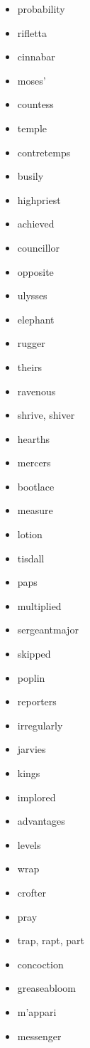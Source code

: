 \documentclass{article}
\begin{document}
\begin{itemize}
    \item probability
    \item rifletta
    \item cinnabar
    \item moses'
    \item countess
    \item temple
    \item contretemps
    \item busily
    \item highpriest
    \item achieved
    \item councillor
    \item opposite
    \item ulysses
    \item elephant
    \item rugger
    \item theirs
    \item ravenous
    \item shrive, shiver
    \item hearths
    \item mercers
    \item bootlace
    \item measure
    \item lotion
    \item tisdall
    \item paps
    \item multiplied
    \item sergeantmajor
    \item skipped
    \item poplin
    \item reporters
    \item irregularly
    \item jarvies
    \item kings
    \item implored
    \item advantages
    \item levels
    \item wrap
    \item crofter
    \item pray
    \item trap, rapt, part
    \item concoction
    \item greaseabloom
    \item m'appari
    \item messenger

\end{itemize}
\end{document}
